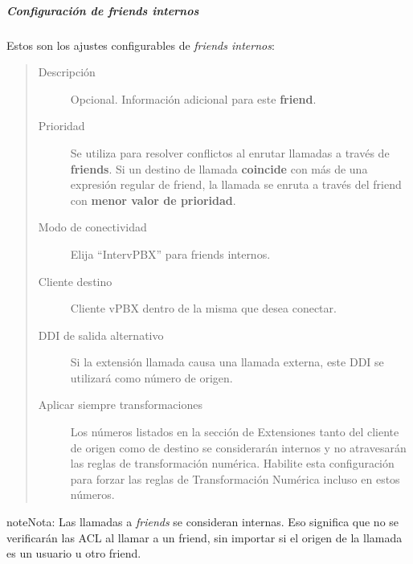 \documentclass[letterpaper,10pt,spanish]{sphinxmanual}
\begin{document}
\subparagraph{Configuración de friends internos}
\label{administration_portal/client/vpbx/routing_endpoints/friends/internal_friends:configuration-of-internal-friends}
Estos son los ajustes configurables de \emph{friends internos}:
\begin{quote}
\begin{description}
\item[{Descripción}] \leavevmode
Opcional. Información adicional para este \textbf{friend}.

\item[{Prioridad}] \leavevmode
Se utiliza para resolver conflictos al enrutar llamadas a través de \textbf{friends}. Si un destino de llamada \textbf{coincide} con más de una expresión regular de friend, la llamada se enruta a través del friend con \textbf{menor valor de prioridad}.

\item[{Modo de conectividad}] \leavevmode
Elija ``IntervPBX'' para friends internos.

\item[{Cliente destino}] \leavevmode
Cliente vPBX dentro de la misma {\hyperref[administration_portal/brand/settings/corporations:corporations]{}} que desea conectar.

\item[{DDI de salida alternativo}] \leavevmode
Si la extensión llamada causa una llamada externa, este DDI se utilizará como número de origen.

\item[{Aplicar siempre transformaciones}] \leavevmode
Los números listados en la sección de Extensiones tanto del cliente de origen como de destino se considerarán internos y no atravesarán las reglas de transformación numérica. Habilite esta configuración para forzar las reglas de Transformación Numérica incluso en estos números.

\end{description}
\end{quote}

\begin{notice}{note}{Nota:}
Las llamadas a \emph{friends} se consideran internas. Eso significa que no se verificarán las ACL al llamar a un friend, sin importar si el origen de la llamada es un usuario u otro friend.
\end{notice}
\end{document}
